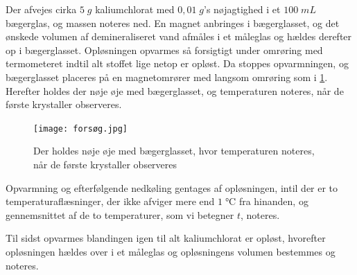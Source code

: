 \documentclass{report}
\begin{document}
Der afvejes cirka $5 \;\unit{g} $ kaliumchlorat med $0,01 \;\unit{g} $'s nøjagtighed i et $100 \;\unit{mL} $ bægerglas, og massen noteres ned. 
En magnet anbringes i bægerglasset, og det ønskede volumen af demineraliseret vand afmåles i et måleglas og hældes derefter op i bægerglasset.
Opløsningen opvarmes så forsigtigt under omrøring med termometeret indtil alt stoffet lige netop er opløst. 
Da stoppes opvarmningen, og bægerglasset placeres på en magnetomrører med langsom omrøring som i \cref{fig:hånd}.
Herefter holdes der nøje øje med bægerglasset, og temperaturen noteres, når de første krystaller observeres. 
\begin{figure}[H]
\begin{center}
  \texttt{[image: forsøg.jpg]}
\end{center}
\caption{Der holdes nøje øje med bægerglasset, hvor temperaturen noteres, når de første krystaller observeres}
\label{fig:hånd}
\end{figure}


Opvarmning og efterfølgende nedkøling gentages af opløsningen, intil der er to temperaturaflæsninger, der ikke afviger mere end $1 \;\unit{\celsius} $ fra hinanden, og gennemsnittet af de to temperaturer, som vi betegner $t$, noteres. 

Til sidst opvarmes blandingen igen til alt kaliumchlorat er opløst, hvorefter opløsningen hældes over i et måleglas og opløsningens volumen bestemmes og noteres.
\end{document}
